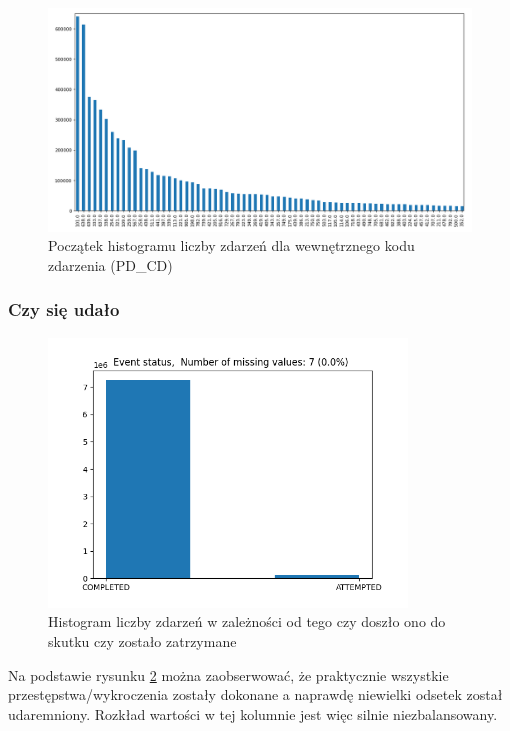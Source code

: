 \documentclass{classrep}
\begin{document}
{{{\begin{figure}[!htbp]
                    \includegraphics[width=\textwidth]{img/hist_pd_cd.png}
                    \caption{Początek histogramu liczby zdarzeń dla wewnętrznego kodu zdarzenia (PD\_CD)}
                    \label{hist_pd_cd}
                \end{figure}
                \FloatBarrier
            }

            \subsubsection{Czy się udało} {
                \begin{figure}[!htbp]
                    \centering
                    \includegraphics[width=0.85\textwidth]{img/Eventstatus-133630.png}
                    \caption{Histogram liczby zdarzeń w zależności od tego czy doszło ono do skutku czy zostało zatrzymane}
                    \label{hist_is_completed}
                \end{figure}
                \FloatBarrier
                Na podstawie rysunku \ref{hist_is_completed} można zaobserwować, że
                praktycznie wszystkie przestępstwa/wykroczenia zostały dokonane a
                naprawdę niewielki odsetek został udaremniony. Rozkład wartości w tej kolumnie jest więc silnie niezbalansowany.
                
}}}
\end{document}
